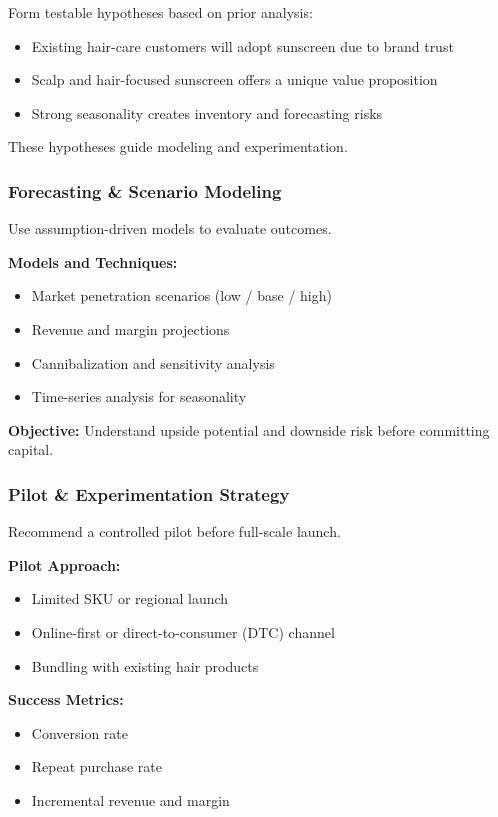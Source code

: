 \documentclass[10pt,a4paper]{article}
\begin{document}
	Form testable hypotheses based on prior analysis:
	
	\begin{itemize}
	    \item Existing hair-care customers will adopt sunscreen due to brand trust
	    \item Scalp and hair-focused sunscreen offers a unique value proposition
	    \item Strong seasonality creates inventory and forecasting risks
	\end{itemize}
	
	These hypotheses guide modeling and experimentation.
	
	\subsubsection{Forecasting \& Scenario Modeling}
	
	Use assumption-driven models to evaluate outcomes.
	
	\textbf{Models and Techniques:}
	\begin{itemize}
	    \item Market penetration scenarios (low / base / high)
	    \item Revenue and margin projections
	    \item Cannibalization and sensitivity analysis
	    \item Time-series analysis for seasonality
	\end{itemize}
	
	\textbf{Objective:} Understand upside potential and downside risk before committing capital.
	
	\subsubsection{Pilot \& Experimentation Strategy}
	
	Recommend a controlled pilot before full-scale launch.
	
	\textbf{Pilot Approach:}
	\begin{itemize}
	    \item Limited SKU or regional launch
	    \item Online-first or direct-to-consumer (DTC) channel
	    \item Bundling with existing hair products
	\end{itemize}
	
	\textbf{Success Metrics:}
	\begin{itemize}
	    \item Conversion rate
	    \item Repeat purchase rate
	    \item Incremental revenue and margin
	\end{itemize}
	
\end{document}
